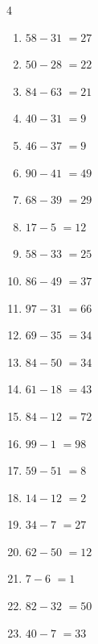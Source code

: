 \begin{multicols}{4}
\begin{enumerate}
  \item $58-31$
        $=27$

  \item $50-28$
        $=22$

  \item $84-63$
        $=21$

  \item $40-31$
        $=9$

  \item $46-37$
        $=9$

  \item $90-41$
        $=49$

  \item $68-39$
        $=29$

  \item $17-5$
        $=12$

  \item $58-33$
        $=25$

  \item $86-49$
        $=37$

  \item $97-31$
        $=66$

  \item $69-35$
        $=34$

  \item $84-50$
        $=34$

  \item $61-18$
        $=43$

  \item $84-12$
        $=72$

  \item $99-1$
        $=98$

  \item $59-51$
        $=8$

  \item $14-12$
        $=2$

  \item $34-7$
        $=27$

  \item $62-50$
        $=12$

  \item $7-6$
        $=1$

  \item $82-32$
        $=50$

  \item $40-7$
        $=33$

\columnbreak %


\end{enumerate}
\end{multicols}
